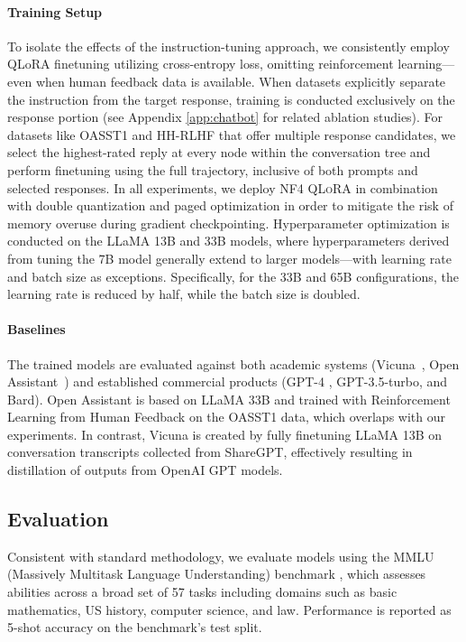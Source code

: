 \paragraph{Training Setup} To isolate the effects of the instruction-tuning approach, we consistently employ QLoRA finetuning utilizing cross-entropy loss, omitting reinforcement learning—even when human feedback data is available. When datasets explicitly separate the instruction from the target response, training is conducted exclusively on the response portion (see Appendix \ref{app:chatbot} for related ablation studies). For datasets like OASST1 and HH-RLHF that offer multiple response candidates, we select the highest-rated reply at every node within the conversation tree and perform finetuning using the full trajectory, inclusive of both prompts and selected responses. In all experiments, we deploy NF4 \textsc{QLoRA} in combination with double quantization and paged optimization in order to mitigate the risk of memory overuse during gradient checkpointing. Hyperparameter optimization is conducted on the LLaMA 13B and 33B models, where hyperparameters derived from tuning the 7B model generally extend to larger models—with learning rate and batch size as exceptions. Specifically, for the 33B and 65B configurations, the learning rate is reduced by half, while the batch size is doubled.

\paragraph{Baselines} The trained models are evaluated against both academic systems (Vicuna~\citep{vicuna2023}, Open Assistant~\citep{kopf2023openassistant}) and established commercial products (GPT-4 \citep{openai2023gpt}, GPT-3.5-turbo, and Bard). Open Assistant is based on LLaMA 33B and trained with Reinforcement Learning from Human Feedback on the OASST1 data, which overlaps with our experiments. In contrast, Vicuna is created by fully finetuning LLaMA 13B on conversation transcripts collected from ShareGPT, effectively resulting in distillation of outputs from OpenAI GPT models.

\subsection{Evaluation}

Consistent with standard methodology, we evaluate models using the MMLU (Massively Multitask Language Understanding) benchmark \citep{hendrycksmeasuring}, which assesses abilities across a broad set of 57 tasks including domains such as basic mathematics, US history, computer science, and law. Performance is reported as 5-shot accuracy on the benchmark’s test split.

